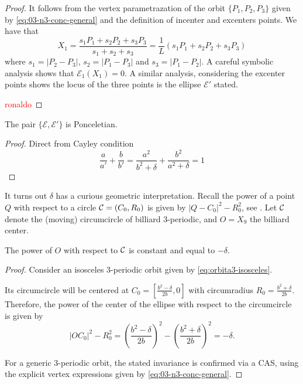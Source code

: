 \begin{proof}
It follows from the vertex parametrazation of the orbit $\{P_1,P_2,P_3\}$ given by   \cref{eq:03-n3-conc-general} and the definition of incenter and excenters points.  
We have that
\[X_1=\frac{s_1 P_1+s_2P_2+s_3P_3}{s_1+s_2+s_3}=
\frac{1}{L}(s_1P_1+s_2P_2+s_3P_3)\]
where $s_1=|P_2-P_3|$, $s_2=|P_1-P_3|$ and $s_3=|P_1-P_2|$.
A careful symbolic analysis shows that $\mathcal{E}_1(X_1)=0$. A similar analysis, considering the excenter points shows the locus of the three points is the ellipse $\mathcal{E}'$ stated.

\textcolor{red}{ronaldo}
\end{proof}

\begin{corollary}
The pair $\{\mathcal{E},\mathcal{E}'\}$ is Ponceletian.
\label{cor:03-excentral-billiard-poncelet}
\end{corollary}

\begin{proof}
Direct from Cayley condition
\[\frac{a}{a'}+\frac{b}{b'}=\frac{a^2}{b^2+\delta}+\frac{b^2}{a^2+\delta}= 1\]

\end{proof}

It turns out $\delta$ has a curious geometric interpretation. Recall the power of a point $Q$ with respect to a circle $\mathcal{C}=(C_0,R_0)$ is given by $|Q-C_0|^2-R_0^2$, see \cite[Circle Power]{mw}. Let $\mathcal{C}$ denote the (moving) circumcircle of billiard 3-periodic, and $O=X_9$ the billiard center.

\begin{proposition}
The power of $O$ with respect to $\mathcal{C}$ is constant and equal to $-\delta$.
\end{proposition}

\begin{proof}
Consider an isosceles 3-periodic orbit given by \cref{eq:orbita3-isosceles}.  
  
	Its circumcircle will be centered at $C_0=[ {\frac { {b}^{2}-\delta}{2b}},0]$ with circumradius $R_0=\frac {{b}^{2}+\delta}{2b}.$
	Therefore, the power of the center of the ellipse with respect to the circumcircle is given by  
	$$|OC_0|^2-R_0^2=\left(\frac { {b}^{2}-\delta}{2b}\right)^2 - \left(\frac {{b}^{2}+\delta}{2b}\right)^2=-\delta.$$
	
	For a generic 3-periodic orbit, the stated invariance is confirmed via a CAS, using the explicit vertex expressions given by  \cref{eq:03-n3-conc-general}.  
\end{proof}

